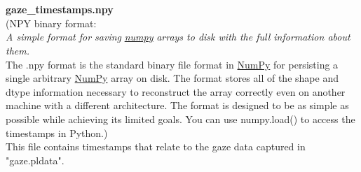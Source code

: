 \begin{description}
\begin{addmargin}[0em]{0em}
    \textbf{\\\\}
    \begin{addmargin}[1em]{0em} %
        \label{gaze_timestamps.npy}
        \textbf{gaze\_timestamps.npy}\\
        (NPY binary format:\\
        \textit{A simple format for saving}
        \href{https://numpy.org/doc/stable/reference/generated/numpy.lib.format.html#module-numpy.lib.format}{\textit{numpy}}
        \textit{arrays to disk with the full information about them.}\\
        The .npy format is the standard binary file format in 
        \href{https://numpy.org/doc/stable/reference/generated/numpy.lib.format.html#module-numpy.lib.format}{NumPy}
        for persisting a single arbitrary
        \href{https://numpy.org/doc/stable/reference/generated/numpy.lib.format.html#module-numpy.lib.format}{NumPy}
        array on disk. The format stores all of the shape and dtype information necessary to
        reconstruct the array correctly even on another machine with a different architecture.
        The format is designed to be as simple as possible while achieving its limited goals.
        You can use numpy.load() to access the timestamps in Python.)\\
        This file contains timestamps that relate to the gaze data captured in "gaze.pldata". 
    \end{addmargin} %


\end{addmargin}
\end{description}
